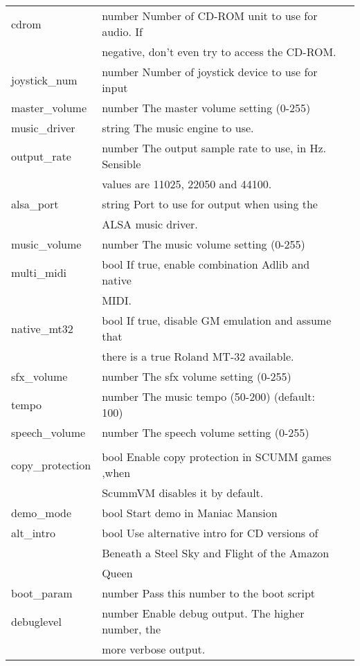\begin{tabular}[hf]{lll}
\\
        cdrom           &number   Number of CD-ROM unit to use for audio. If\\
                        &         negative, don't even try to access the CD-ROM.\\
        joystick\_num   &number   Number of joystick device to use for input\\
        master\_volume  &number   The master volume setting (0-255)\\
        music\_driver   &string   The music engine to use.\\
        output\_rate    &number   The output sample rate to use, in Hz. Sensible\\
                        &         values are 11025, 22050 and 44100.\\
        alsa\_port      &string   Port to use for output when using the\\
                        &         ALSA music driver.\\
        music\_volume   &number   The music volume setting (0-255)\\
        multi\_midi     &bool     If true, enable combination Adlib and native\\
                        &         MIDI.\\
        native\_mt32    &bool     If true, disable GM emulation and assume that\\
                        &         there is a true Roland MT-32 available.\\
        sfx\_volume     &number   The sfx volume setting (0-255)\\
        tempo           &number   The music tempo (50-200) (default: 100)\\
        speech\_volume  &number   The speech volume setting (0-255)\\
\\
        copy\_protection&bool     Enable copy protection in SCUMM games ,when\\
                        &         ScummVM disables it by default.\\
        demo\_mode      &bool     Start demo in Maniac Mansion\\
        alt\_intro      &bool     Use alternative intro for CD versions of \\
                        &         Beneath a Steel Sky and Flight of the Amazon\\
                        &         Queen
\\
        boot\_param     &number   Pass this number to the boot script\\
        debuglevel      &number   Enable debug output. The higher number, the\\
                        &         more verbose output.\\
\end{tabular}

